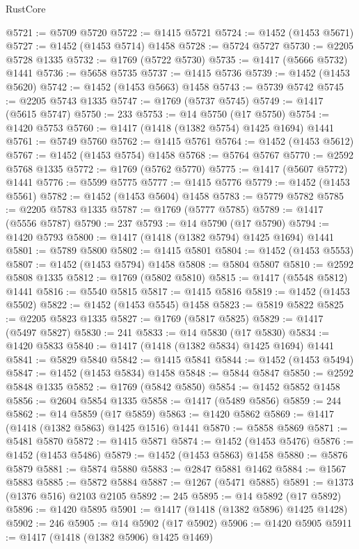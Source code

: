 \begin{lexlean}{RustCore}
\begin{coremodule}
@5721 := @5709 @5720
@5722 := @1415 @5721
@5724 := @1452 (@1453 @5671)
@5727 := @1452 (@1453 @5714) @1458
@5728 := @5724 @5727
@5730 := @2205 @5728 @1335
@5732 := @1769 (@5722 @5730)
@5735 := @1417 (@5666 @5732) @1441
@5736 := @5658 @5735
@5737 := @1415 @5736
@5739 := @1452 (@1453 @5620)
@5742 := @1452 (@1453 @5663) @1458
@5743 := @5739 @5742
@5745 := @2205 @5743 @1335
@5747 := @1769 (@5737 @5745)
@5749 := @1417 (@5615 @5747)
@5750 := 233
@5753 := @14 @5750 (@17 @5750)
@5754 := @1420 @5753
@5760 := @1417 (@1418 (@1382 @5754) @1425 @1694) @1441
@5761 := @5749 @5760
@5762 := @1415 @5761
@5764 := @1452 (@1453 @5612)
@5767 := @1452 (@1453 @5754) @1458
@5768 := @5764 @5767
@5770 := @2592 @5768 @1335
@5772 := @1769 (@5762 @5770)
@5775 := @1417 (@5607 @5772) @1441
@5776 := @5599 @5775
@5777 := @1415 @5776
@5779 := @1452 (@1453 @5561)
@5782 := @1452 (@1453 @5604) @1458
@5783 := @5779 @5782
@5785 := @2205 @5783 @1335
@5787 := @1769 (@5777 @5785)
@5789 := @1417 (@5556 @5787)
@5790 := 237
@5793 := @14 @5790 (@17 @5790)
@5794 := @1420 @5793
@5800 := @1417 (@1418 (@1382 @5794) @1425 @1694) @1441
@5801 := @5789 @5800
@5802 := @1415 @5801
@5804 := @1452 (@1453 @5553)
@5807 := @1452 (@1453 @5794) @1458
@5808 := @5804 @5807
@5810 := @2592 @5808 @1335
@5812 := @1769 (@5802 @5810)
@5815 := @1417 (@5548 @5812) @1441
@5816 := @5540 @5815
@5817 := @1415 @5816
@5819 := @1452 (@1453 @5502)
@5822 := @1452 (@1453 @5545) @1458
@5823 := @5819 @5822
@5825 := @2205 @5823 @1335
@5827 := @1769 (@5817 @5825)
@5829 := @1417 (@5497 @5827)
@5830 := 241
@5833 := @14 @5830 (@17 @5830)
@5834 := @1420 @5833
@5840 := @1417 (@1418 (@1382 @5834) @1425 @1694) @1441
@5841 := @5829 @5840
@5842 := @1415 @5841
@5844 := @1452 (@1453 @5494)
@5847 := @1452 (@1453 @5834) @1458
@5848 := @5844 @5847
@5850 := @2592 @5848 @1335
@5852 := @1769 (@5842 @5850)
@5854 := @1452 @5852 @1458
@5856 := @2604 @5854 @1335
@5858 := @1417 (@5489 @5856)
@5859 := 244
@5862 := @14 @5859 (@17 @5859)
@5863 := @1420 @5862
@5869 := @1417 (@1418 (@1382 @5863) @1425 @1516) @1441
@5870 := @5858 @5869
@5871 := @5481 @5870
@5872 := @1415 @5871
@5874 := @1452 (@1453 @5476)
@5876 := @1452 (@1453 @5486)
@5879 := @1452 (@1453 @5863) @1458
@5880 := @5876 @5879
@5881 := @5874 @5880
@5883 := @2847 @5881 @1462
@5884 := @1567 @5883
@5885 := @5872 @5884
@5887 := @1267 (@5471 @5885)
@5891 := @1373 (@1376 @516) @2103 @2105
@5892 := 245
@5895 := @14 @5892 (@17 @5892)
@5896 := @1420 @5895
@5901 := @1417 (@1418 (@1382 @5896) @1425 @1428)
@5902 := 246
@5905 := @14 @5902 (@17 @5902)
@5906 := @1420 @5905
@5911 := @1417 (@1418 (@1382 @5906) @1425 @1469)

\end{coremodule}
\end{lexlean}
